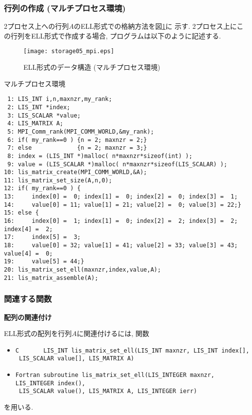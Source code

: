 \documentclass[a4paper]{jarticle}
\begin{document}
{{\subsubsection{行列の作成 (マルチプロセス環境)}
2プロセス上への行列$A$のELL形式での格納方法を図\ref{fig:storage05_mpi}に
示す. 
2プロセス上にこの行列をELL形式で作成する場合, プログラムは以下のように記述する. 
\begin{figure}[h]
{\centering 
\texttt{[image: storage05\_mpi.eps]} 
\caption{ELL形式のデータ構造 (マルチプロセス環境)}\label{fig:storage05_mpi}}
\end{figure}
\begin{itembox}[l]{マルチプロセス環境}
\small
\begin{verbatim}
 1: LIS_INT i,n,maxnzr,my_rank;
 2: LIS_INT *index;
 3: LIS_SCALAR *value;
 4: LIS_MATRIX A;
 5: MPI_Comm_rank(MPI_COMM_WORLD,&my_rank);
 6: if( my_rank==0 ) {n = 2; maxnzr = 2;}
 7: else             {n = 2; maxnzr = 3;}
 8: index = (LIS_INT *)malloc( n*maxnzr*sizeof(int) );
 9: value = (LIS_SCALAR *)malloc( n*maxnzr*sizeof(LIS_SCALAR) );
10: lis_matrix_create(MPI_COMM_WORLD,&A);
11: lis_matrix_set_size(A,n,0);
12: if( my_rank==0 ) {
13:     index[0] =  0; index[1] =  0; index[2] =  0; index[3] =  1;
14:     value[0] = 11; value[1] = 21; value[2] =  0; value[3] = 22;}
15: else {
16:     index[0] =  1; index[1] =  0; index[2] =  2; index[3] =  2; index[4] =  2;
17:     index[5] =  3;
18:     value[0] = 32; value[1] = 41; value[2] = 33; value[3] = 43; value[4] =  0;
19:     value[5] = 44;}
20: lis_matrix_set_ell(maxnzr,index,value,A);
21: lis_matrix_assemble(A);
\end{verbatim}
\end{itembox}

\subsubsection{関連する関数}
\noindent
{\bf 配列の関連付け}

ELL形式の配列を行列$A$に関連付けるには, 関数
\begin{itemize}
\item \verb|C       LIS_INT lis_matrix_set_ell(LIS_INT maxnzr, LIS_INT index[],|\\
      \verb| LIS_SCALAR value[], LIS_MATRIX A)|
\item \verb|Fortran subroutine lis_matrix_set_ell(LIS_INTEGER maxnzr, LIS_INTEGER index(),|\\
      \verb| LIS_SCALAR value(), LIS_MATRIX A, LIS_INTEGER ierr)|
\end{itemize}
を用いる. 

}}
\end{document}
